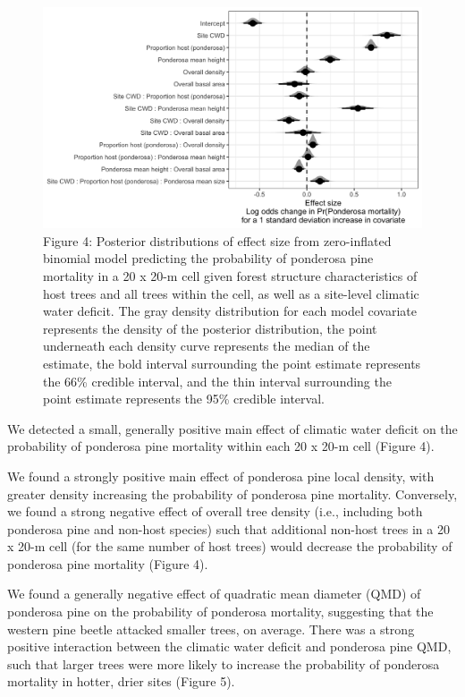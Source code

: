 \documentclass[]{article}
\begin{document}
\begin{figure}
\centering
\includegraphics{../../figures/effect-sizes-halfeye.png}
\caption{Figure 4: Posterior distributions of effect size from
zero-inflated binomial model predicting the probability of ponderosa
pine mortality in a 20 x 20-m cell given forest structure
characteristics of host trees and all trees within the cell, as well as
a site-level climatic water deficit. The gray density distribution for
each model covariate represents the density of the posterior
distribution, the point underneath each density curve represents the
median of the estimate, the bold interval surrounding the point estimate
represents the 66\% credible interval, and the thin interval surrounding
the point estimate represents the 95\% credible interval.}
\end{figure}

We detected a small, generally positive main effect of climatic water
deficit on the probability of ponderosa pine mortality within each 20 x
20-m cell (Figure 4).

We found a strongly positive main effect of ponderosa pine local
density, with greater density increasing the probability of ponderosa
pine mortality. Conversely, we found a strong negative effect of overall
tree density (i.e., including both ponderosa pine and non-host species)
such that additional non-host trees in a 20 x 20-m cell (for the same
number of host trees) would decrease the probability of ponderosa pine
mortality (Figure 4).

We found a generally negative effect of quadratic mean diameter (QMD) of
ponderosa pine on the probability of ponderosa mortality, suggesting
that the western pine beetle attacked smaller trees, on average. There
was a strong positive interaction between the climatic water deficit and
ponderosa pine QMD, such that larger trees were more likely to increase
the probability of ponderosa mortality in hotter, drier sites (Figure
5).
\end{document}
